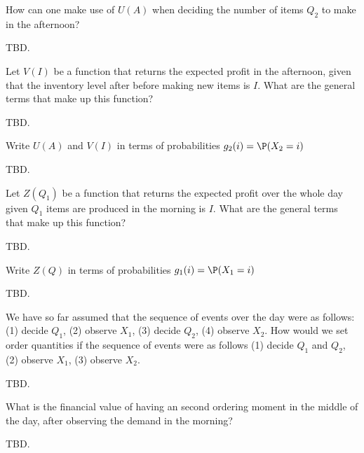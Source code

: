 \begin{question}
How can one make use of $U(A)$ when deciding the number of items $Q_2$ to make in the afternoon?
   \begin{solution}
     TBD.
   \end{solution}
\end{question}

\begin{question}
Let $V(I)$ be a function that returns the expected profit in the afternoon, given that the inventory level after before making new items is $I$. What are the general terms that make up this function?
   \begin{solution}
     TBD.
   \end{solution}
\end{question}

\begin{question}
Write $U(A)$ and $V(I)$ in terms of probabilities $g_2(i)=\P(X_2=i)$
   \begin{solution}
     TBD.
   \end{solution}
\end{question}

\begin{question}
Let $Z(Q_1)$ be a function that returns the expected profit over the whole day given $Q_1$ items are produced in the morning is $I$. What are the general terms that make up this function?
   \begin{solution}
     TBD.
   \end{solution}
\end{question}

\begin{question}
Write $Z(Q)$ in terms of probabilities $g_1(i)=\P(X_1=i)$
   \begin{solution}
     TBD.
   \end{solution}
\end{question}

\begin{question}
We have so far assumed that the sequence of events over the day were as follows: (1) decide $Q_1$, (2) observe $X_1$, (3) decide $Q_2$, (4) observe $X_2$. How would we set order quantities if the sequence of events were as follows (1) decide $Q_1$ and $Q_2$, (2) observe $X_1$, (3) observe $X_2$.
   \begin{solution}
     TBD.
   \end{solution}
\end{question}

\begin{question}
What is the financial value of having an second ordering moment in the middle of the day, after observing the demand in the morning?
   \begin{solution}
     TBD.
   \end{solution}
\end{question}

